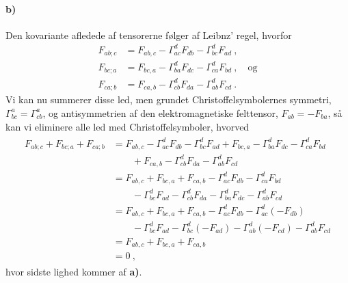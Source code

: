\documentclass[../main.tex]{subfiles}
\begin{document}

\paragraph{b)}

Den kovariante afledede af tensorerne følger af Leibnz' regel, hvorfor
\begin{subequations}
\begin{align}
    F_{ab;c} &= F_{ab,c} - \Gamma^d_{ac} F_{db} - \Gamma^d_{bc} F_{ad} \: , \\
    F_{bc;a} &= F_{bc,a} - \Gamma^d_{ba} F_{dc} - \Gamma^d_{ca} F_{bd} \: , \quad \text{og} \\
    F_{ca;b} &= F_{ca,b} - \Gamma^d_{cb} F_{da} - \Gamma^d_{ab} F_{cd} \: .
\end{align}
\end{subequations}
Vi kan nu summerer disse led, men grundet Christoffelsymbolernes symmetri, $\Gamma^a_{bc} = \Gamma^a_{cb}$, og antisymmetrien af den elektromagnetiske felttensor, $F_{ab} = - F_{ba}$, så kan vi eliminere alle led med Christoffelsymboler, hvorved
\begin{align}
\begin{split}
    F_{ab;c} + F_{bc;a} + F_{ca;b} &= F_{ab,c} - \Gamma^d_{ac} F_{db} - \Gamma^d_{bc} F_{ad} + F_{bc,a} - \Gamma^d_{ba} F_{dc} - \Gamma^d_{ca} F_{bd} \\
        &\qquad + F_{ca,b} - \Gamma^d_{cb} F_{da} - \Gamma^d_{ab} F_{cd} \\
        &= F_{ab,c} + F_{bc,a} + F_{ca,b} - \Gamma^d_{ac} F_{db} - \Gamma^d_{ca} F_{bd} \\
            &\qquad - \Gamma^d_{bc} F_{ad} - \Gamma^d_{cb} F_{da} - \Gamma^d_{ba} F_{dc} - \Gamma^d_{ab} F_{cd} \\
        &= F_{ab,c} + F_{bc,a} + F_{ca,b} - \Gamma^d_{ac} F_{db} - \Gamma^d_{ac} (- F_{db}) \\
            &\qquad - \Gamma^d_{bc} F_{ad} - \Gamma^d_{bc} (- F_{ad}) - \Gamma^d_{ab} (-F_{cd}) - \Gamma^d_{ab} F_{cd} \\
        &= F_{ab,c} + F_{bc,a} + F_{ca,b} \\
        &= 0 \: ,
\end{split}
\end{align}
hvor sidste lighed kommer af \textbf{a)}.



\end{document}
